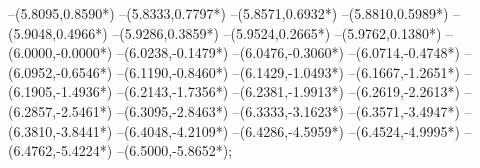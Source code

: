 {	--(5.8095,{0.8590*\yskala})
	--(5.8333,{0.7797*\yskala})
	--(5.8571,{0.6932*\yskala})
	--(5.8810,{0.5989*\yskala})
	--(5.9048,{0.4966*\yskala})
	--(5.9286,{0.3859*\yskala})
	--(5.9524,{0.2665*\yskala})
	--(5.9762,{0.1380*\yskala})
	--(6.0000,{-0.0000*\yskala})
	--(6.0238,{-0.1479*\yskala})
	--(6.0476,{-0.3060*\yskala})
	--(6.0714,{-0.4748*\yskala})
	--(6.0952,{-0.6546*\yskala})
	--(6.1190,{-0.8460*\yskala})
	--(6.1429,{-1.0493*\yskala})
	--(6.1667,{-1.2651*\yskala})
	--(6.1905,{-1.4936*\yskala})
	--(6.2143,{-1.7356*\yskala})
	--(6.2381,{-1.9913*\yskala})
	--(6.2619,{-2.2613*\yskala})
	--(6.2857,{-2.5461*\yskala})
	--(6.3095,{-2.8463*\yskala})
	--(6.3333,{-3.1623*\yskala})
	--(6.3571,{-3.4947*\yskala})
	--(6.3810,{-3.8441*\yskala})
	--(6.4048,{-4.2109*\yskala})
	--(6.4286,{-4.5959*\yskala})
	--(6.4524,{-4.9995*\yskala})
	--(6.4762,{-5.4224*\yskala})
	--(6.5000,{-5.8652*\yskala});
}
